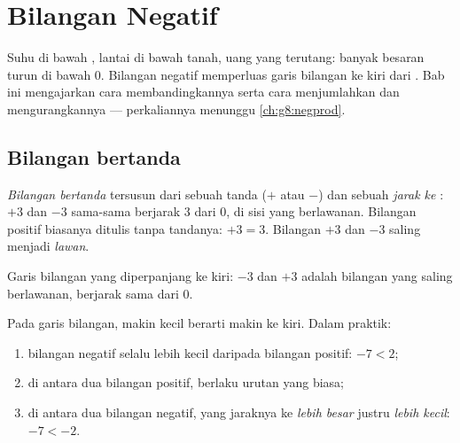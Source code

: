\chapter{Bilangan Negatif}\label{ch:g7:negatives}

Suhu di bawah , lantai di bawah tanah, uang yang terutang: banyak
besaran turun di bawah $0$. Bilangan negatif memperluas garis bilangan
ke kiri dari . Bab ini mengajarkan cara membandingkannya serta cara
menjumlahkan dan mengurangkannya --- perkaliannya menunggu
\cref{ch:g8:negprod}.

\section{Bilangan bertanda}

\begin{definition}\label{def:g7:negatives:def}
\emph{Bilangan bertanda} tersusun dari sebuah
tanda ($+$ atau $-$) dan sebuah \emph{jarak ke }: $+3$ dan $-3$
sama-sama berjarak $3$ dari $0$, di sisi yang berlawanan. Bilangan
positif biasanya ditulis tanpa tandanya: $+3 = 3$. Bilangan $+3$ dan
$-3$ saling menjadi \emph{lawan}.
\end{definition}

\begin{omfigure}

{\small Garis bilangan yang diperpanjang ke kiri: $-3$ dan $+3$ adalah
bilangan yang saling berlawanan, berjarak sama dari $0$.}
\end{omfigure}

\begin{method}\label{met:g7:negatives:compare}
Pada garis bilangan, makin kecil berarti makin ke kiri. Dalam praktik:
\begin{enumerate}
  \item bilangan negatif selalu lebih kecil daripada bilangan positif:
        $-7 < 2$;
  \item di antara dua bilangan positif, berlaku urutan yang biasa;
  \item di antara dua bilangan negatif, yang jaraknya ke 
        \emph{lebih besar} justru \emph{lebih kecil}: $-7 < -2$.
\end{enumerate}
\end{method}

